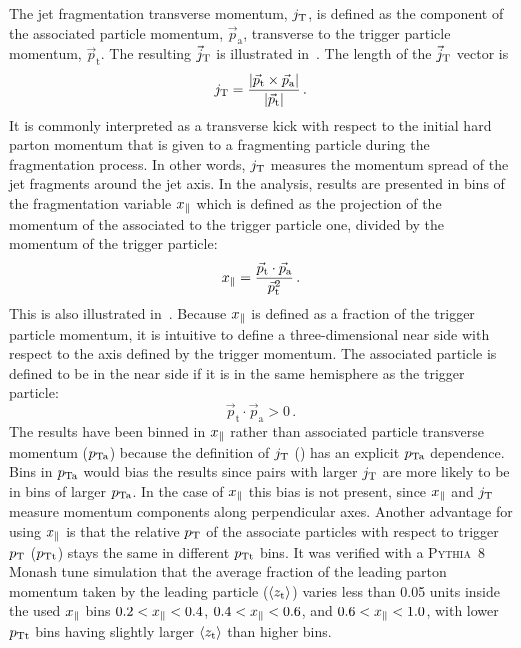 The jet fragmentation transverse momentum, $j_{\rm T}$, is defined as the component of the associated particle momentum, $\vec{p}_{\mathrm{a}}$, transverse to the trigger particle momentum, $\vec{p}_{\mathrm{t}}$. The resulting $\vec{j}_{\rm T}$ is illustrated in~. The length of the $\vec{j}_{\rm T}$ vector is
  \begin{equation}
    j_{\rm T} = \frac{|\vec{p}_{\mathrm{t}} \times \vec{p}_{\mathrm{a}}|}{|\vec{p}_{\mathrm{t}}|} \,.
  \label{eq:jtdefinition}
  \end{equation}
It is commonly interpreted as a transverse kick with respect to the initial hard parton momentum that is given to a fragmenting particle during the fragmentation process. In other words, $j_{\rm T}$ measures the momentum spread of the jet fragments around the jet axis. In the analysis, results are presented in bins of the fragmentation variable $x_{\parallel}$ which is defined as the projection of the momentum of the associated to the trigger particle one, divided by the momentum of the trigger particle: 
  \begin{equation}
    x_{\parallel} = \frac{\vec{p}_{\mathrm{t}} \cdot \vec{p}_{\mathrm{a}}}{\vec{p}_{\mathrm{t}}^{2}} \,.
  \label{eq:xedefinition}
  \end{equation}
This is also illustrated in~. Because $x_{\parallel}$ is defined as a fraction of the trigger particle momentum, it is intuitive to define a three-dimensional near side with respect to the axis defined by the trigger momentum. The associated particle is defined to be in the near side if it is in the same hemisphere as the trigger particle:
  \begin{equation}
    \vec{p}_{\mathrm{t}} \cdot \vec{p}_{\mathrm{a}} > 0 \,.
    \label{eq:3Dnearside}
  \end{equation}
The results have been binned in $x_{\parallel}$ rather than associated particle transverse momentum ($p_{\rm Ta}$) because the definition of $j_{\rm T}$ () has an explicit $p_{\rm Ta}$ dependence. Bins in $p_{\rm Ta}$ would bias the results since pairs with larger $j_{\rm T}$ are more likely to be in bins of larger $p_{\rm Ta}$. In the case of $x_{\parallel}$ this bias is not present, since $x_{\parallel}$ and $j_{\rm T}$ measure momentum components along perpendicular axes. Another advantage for using $x_{\parallel}$ is that the relative $p_{\rm T}$ of the associate particles with respect to trigger $p_{\rm T}$ ($p_{\rm Tt}$) stays the same in different $p_{\rm Tt}$ bins. It was verified with a \textsc{Pythia}~8~\cite{introPythia81,introPythia82} Monash tune simulation that the average fraction of the leading parton momentum taken by the leading particle ($\left<z_{\mathrm{t}}\right>$) varies less than 0.05 units inside the used $x_{\parallel}$ bins $0.2 < x_{\parallel} < 0.4$, $0.4 < x_{\parallel} < 0.6$, and $0.6 < x_{\parallel} < 1.0$, with lower $p_{\rm Tt}$ bins having slightly larger $\left<z_{\mathrm{t}}\right>$ than higher bins.
  
